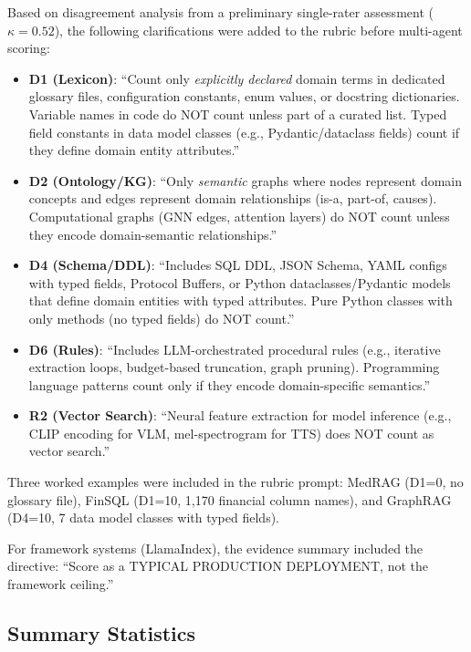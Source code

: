 \documentclass[10pt,a4paper]{article}
\begin{document}
\label{sec:rubric_refinements}

Based on disagreement analysis from a preliminary single-rater assessment ($\kappa = 0.52$), the following clarifications were added to the rubric before multi-agent scoring:

\begin{itemize}
\item \textbf{D1 (Lexicon)}: ``Count only \textit{explicitly declared} domain terms in dedicated glossary files, configuration constants, enum values, or docstring dictionaries. Variable names in code do NOT count unless part of a curated list. Typed field constants in data model classes (e.g., Pydantic/dataclass fields) count if they define domain entity attributes.''
\item \textbf{D2 (Ontology/KG)}: ``Only \textit{semantic} graphs where nodes represent domain concepts and edges represent domain relationships (is-a, part-of, causes). Computational graphs (GNN edges, attention layers) do NOT count unless they encode domain-semantic relationships.''
\item \textbf{D4 (Schema/DDL)}: ``Includes SQL DDL, JSON Schema, YAML configs with typed fields, Protocol Buffers, or Python dataclasses/Pydantic models that define domain entities with typed attributes. Pure Python classes with only methods (no typed fields) do NOT count.''
\item \textbf{D6 (Rules)}: ``Includes LLM-orchestrated procedural rules (e.g., iterative extraction loops, budget-based truncation, graph pruning). Programming language patterns count only if they encode domain-specific semantics.''
\item \textbf{R2 (Vector Search)}: ``Neural feature extraction for model inference (e.g., CLIP encoding for VLM, mel-spectrogram for TTS) does NOT count as vector search.''
\end{itemize}

Three worked examples were included in the rubric prompt: MedRAG (D1=0, no glossary file), FinSQL (D1=10, 1,170 financial column names), and GraphRAG (D4=10, 7 data model classes with typed fields).

For framework systems (LlamaIndex), the evidence summary included the directive: ``Score as a TYPICAL PRODUCTION DEPLOYMENT, not the framework ceiling.''

\subsection{Summary Statistics}
\end{document}
